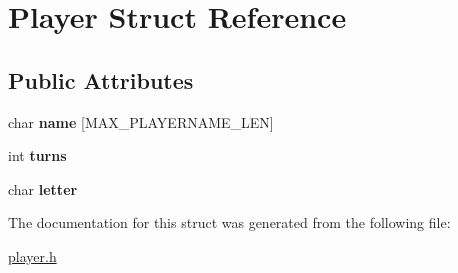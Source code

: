 \hypertarget{structPlayer}{\section{Player Struct Reference}
\label{structPlayer}
}
\subsection*{Public Attributes}
\begin{DoxyCompactItemize}
\item 
\hypertarget{structPlayer_a2188343706cceb7aada96908e4ce2fec}{char {\bfseries name} \mbox{[}M\-A\-X\-\_\-\-P\-L\-A\-Y\-E\-R\-N\-A\-M\-E\-\_\-\-L\-E\-N\mbox{]}}\label{structPlayer_a2188343706cceb7aada96908e4ce2fec}

\item 
\hypertarget{structPlayer_adaf114bb3b7aac782ce085e28f41e8b3}{int {\bfseries turns}}\label{structPlayer_adaf114bb3b7aac782ce085e28f41e8b3}

\item 
\hypertarget{structPlayer_ac64a7a99df0f570dc315e217cf234da8}{char {\bfseries letter}}\label{structPlayer_ac64a7a99df0f570dc315e217cf234da8}

\end{DoxyCompactItemize}


The documentation for this struct was generated from the following file\-:\begin{DoxyCompactItemize}
\item 
\hyperlink{player_8h}{player.\-h}\end{DoxyCompactItemize}
